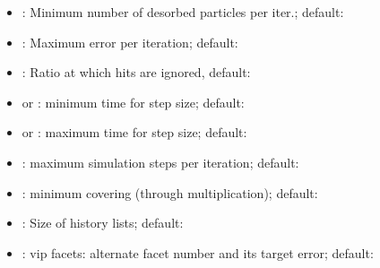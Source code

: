 \begin{itemize}[noitemsep,topsep=0pt, partopsep=0pt]
\item {}: Minimum number of desorbed particles per iter.; default: 
\item {}: Maximum error per iteration; default: 
\item {}: Ratio at which hits are ignored, default: 
\item {} or : minimum time for step size; default:
\item {} or : maximum time for step size; default:
\item {}: maximum simulation steps per iteration; default:
\item {}: minimum covering (through multiplication); default:
\item {}: Size of history lists; default:
\item {}: vip facets: alternate facet number and its target error; default:\codew{[]}
\end{itemize}
\newpage
%
%


